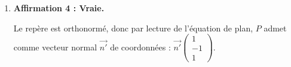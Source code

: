 \documentclass[10pt]{article}
\providecommand{\vect}[1]{\overrightarrow{#1}}
\begin{document}
\begin{enumerate}
	\[
	\begin{aligned}
		\begin{cases}
			15+k=1+4 s \\
			8-k=2+4 s \\
			-6+2 k=1-6 s
		\end{cases}
		&\iff \begin{cases}
			k=-14 + 4 s \\
			8-(-14 + 4 s)=2+4 s \\
			-6+2(- 14 + 4 s)=1-6 s
		\end{cases}\\
		&\iff \begin{cases}
			k=-14+4 s \\
			8+14-4 s=2+4 s \\
			-6-28+8 s=1-6 s
		\end{cases}\\
		&\iff \begin{cases}
			k=-14+4 s \\
			8 s=20 \\
			14 s=35
		\end{cases}\\
		&\iff \begin{cases}
			k=-14+4 s \\
			s=\frac{20}{8}=\frac{5}{2} \\
			s=\frac{35}{14}=\frac{5}{2}
		\end{cases}\\
		&\iff \begin{cases}
			s=2,5 \\
			s=2,5 \\
			k=-4
		\end{cases}
	\end{aligned}
	\]

	Le système a une solution, donc les deux droites ont un point commun, le point qui a comme coordonnées $(11 ~;~ 12 ~;~ -14)$, c'est le point de paramètre $k = -4$ sur $d$ et c'est aussi le point de paramètre $s = 2,5$ sur $d'$.

	Elles sont donc sécantes en ce point, et donc sont coplanaires.

	\item \textbf{Affirmation 4 : Vraie.}

	Le repère est orthonormé, donc par lecture de l'équation de plan, $P$ admet comme vecteur normal $\vect{n'}$ de coordonnées : \quad$\vect{n'} \begin{pmatrix} 1\\-1\\1	\end{pmatrix}$.


\end{enumerate}
\end{document}
